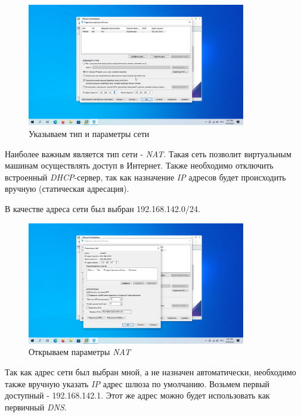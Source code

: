\documentclass[a4paper]{article}
\begin{document}
  \begin{figure}[H]
    \centering
    \includegraphics[width=0.85\textwidth]{Screenshot_6}
    \caption{Указываем тип и параметры сети}
    \label{img:6}
  \end{figure}

  Наиболее важным является тип сети - \textit{NAT}. Такая сеть позволит виртуальным машинам
  осуществлять доступ в Интернет. Также необходимо отключить встроенный \textit{DHCP}-сервер,
  так как назначение \textit{IP} адресов будет происходить вручную (статическая адресация).

  В качестве адреса сети был выбран 192.168.142.0/24.

  \begin{figure}[H]
    \centering
    \includegraphics[width=0.85\textwidth]{Screenshot_7}
    \caption{Открываем параметры \textit{NAT}}
    \label{img:7}
  \end{figure}

  Так как адрес сети был выбран мной, а не назначен автоматически, необходимо
  также вручную указать \textit{IP} адрес шлюза по умолчанию. Возьмем первый доступный
  - 192.168.142.1. Этот же адрес можно будет использовать как первичный \textit{DNS}.
\end{document}

